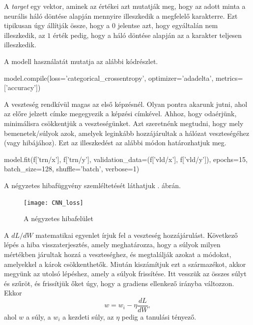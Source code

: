 A \textit{target} egy vektor, aminek az értékei azt mutatják meg, hogy az adott minta a neurális háló döntése alapján mennyire illeszkedik a megfelelő karakterre. Ezt tipikusan úgy állítják össze, hogy a $0$ jelentse azt, hogy egyáltalán nem illeszkedik, az $1$ érték pedig, hogy a háló döntése alapján az a karakter teljesen illeszkedik.

A modell használatát mutatja az alábbi kódrészlet.
\begin{python}
model.compile(loss='categorical_crossentropy',
              optimizer='adadelta',
              metrics=['accuracy'])
\end{python}

A veszteség rendkívül magas az első képzésnél. Olyan pontra akarunk jutni, ahol az előre jelzett címke megegyezik a képzési címkével. Ahhoz, hogy odaérjünk, minimálisra csökkentjük a veszteségünket. Azt szeretnénk megtudni, hogy mely bemenetek/súlyok azok, amelyek leginkább hozzájárultak a hálózat veszteségéhez (vagy hibájához). Ezt az illeszkedést az alábbi módon határozhatjuk meg.

\begin{python}
model.fit(f['trn/x'], f['trn/y'],	
	validation_data=(f['vld/x'], f['vld/y']),
	epochs=15, batch_size=128,
	shuffle='batch', verbose=1)
\end{python}

A négyzetes hibafüggvény szemléltetését láthatjuk . ábrán.

\begin{figure}
\centering
\texttt{[image: CNN\_loss]}
\caption{A négyzetes hibafelület}
\label{fig:CNN_loss}
\end{figure}

A $dL/dW$ matematikai egyenlet írjuk fel a veszteség hozzájárulást. Következő lépés a hiba visszaterjesztés, amely meghatározza, hogy a súlyok milyen mértékben járultak hozzá a veszteséghez, és megtalálják azokat a módokat, amelyekkel a károk csökkenthetők. Miután kiszámítjuk ezt a származékot, akkor megyünk az utolsó lépéshez, amely a súlyok frissítése. Itt vesszük az összes súlyt és szűröt, és frissítjük őket úgy, hogy a gradiens ellenkező irányba változzon. Ekkor
$$
w = w_i - \eta \dfrac{dL}{dW},
$$
ahol $w$ a súly, a $w_i$ a kezdeti súly, az $\eta$ pedig a tanulási tényező.


